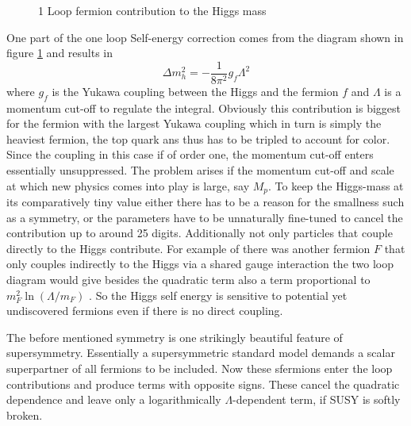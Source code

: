 \begin{figure}[H]
\centering
{}
\caption{1 Loop fermion contribution to the Higgs mass}
\label{fg:HiggsOneLoop}
\end{figure}
One part of the one loop Self-energy correction comes from the diagram shown in figure \ref{fg:HiggsOneLoop} and results in 
\begin{equation}
\Delta m_h^2=-\frac{1}{8\pi^2}g_f\Lambda^2
\end{equation}
where $g_f$ is the Yukawa coupling between the Higgs and the fermion $f$ and $\Lambda$ is a momentum cut-off to regulate the integral. Obviously this contribution is biggest for the fermion with the largest Yukawa coupling which in turn is simply the heaviest fermion, the top quark ans thus has to be tripled to account for color.
Since the coupling in this case if of order one, the momentum cut-off enters essentially unsuppressed. The problem arises if the momentum cut-off and scale at which new physics comes into play is large, say $M_p$. To keep the Higgs-mass at its comparatively tiny value either there has to be a reason for the smallness such as a symmetry, or the parameters have to be unnaturally fine-tuned to cancel the contribution up to around 25 digits.
Additionally not only particles that couple directly to the Higgs contribute. For example of there was another fermion $F$ that only couples indirectly to the Higgs via a shared gauge interaction the two loop diagram would give besides the quadratic term also a term proportional to $m_F^2\ln(\Lambda/m_F)$ \cite{Martin:1997ns}. So the Higgs self energy is sensitive to potential yet undiscovered fermions even if there is no direct coupling. 

The before mentioned symmetry is one strikingly beautiful feature of supersymmetry. Essentially a supersymmetric standard model demands a scalar superpartner of all fermions to be included. Now these sfermions enter the loop contributions and produce terms with opposite signs. These cancel the quadratic dependence and leave only a logarithmically $\Lambda$-dependent term, if SUSY is softly broken.  
\newpage
